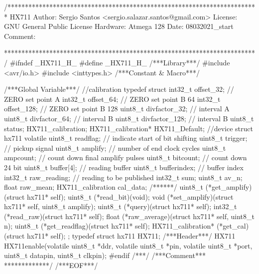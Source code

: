 \begin{verbatimtab}
/************************************************************************
HX711
Author: Sergio Santos
<sergio.salazar.santos@gmail.com>
License: GNU General Public License
Hardware: Atmega 128
Date: 08032021_start
Comment:

************************************************************************/
#ifndef _HX711_H_
#define _HX711_H_
/***Library***/
#include <avr/io.h>
#include <inttypes.h>
/***Constant & Macro***/

/***Global Variable***/
//calibration
typedef struct{
	int32_t offset_32; // ZERO set point A
	int32_t offset_64; // ZERO set point B 64
	int32_t offset_128; // ZERO set point B 128
	uint8_t divfactor_32; // interval A
	uint8_t divfactor_64; // interval B
	uint8_t divfactor_128; // interval B
	uint8_t status;
}HX711_calibration;
HX711_calibration* HX711_Default;
//device
struct hx711{
	volatile uint8_t readflag; // indicate start of bit shifting
	uint8_t trigger; // pickup signal
	uint8_t amplify; // number of end clock cycles
	uint8_t ampcount; // count down final amplify pulses
	uint8_t bitcount; // count down 24 bit
	uint8_t buffer[4]; // reading buffer
	uint8_t bufferindex; // buffer index
	int32_t raw_reading; // reading to be published
	int32_t sum;
	uint8_t av_n;
	float raw_mean;
	HX711_calibration cal_data;
	/******/
	uint8_t (*get_amplify)(struct hx711* self);
	uint8_t (*read_bit)(void);
	void (*set_amplify)(struct hx711* self, uint8_t amplify);
	uint8_t (*query)(struct hx711* self);
	int32_t (*read_raw)(struct hx711* self);
	float (*raw_average)(struct hx711* self, uint8_t n);
	uint8_t (*get_readflag)(struct hx711* self);
	HX711_calibration* (*get_cal)(struct hx711* self);
};
typedef struct hx711 HX711;
/***Header***/
HX711 HX711enable(volatile uint8_t *ddr, volatile uint8_t *pin,
volatile uint8_t *port, uint8_t datapin, uint8_t clkpin);
#endif
/***/
/***Comment***
*************/
/***EOF***/
\end{verbatimtab}